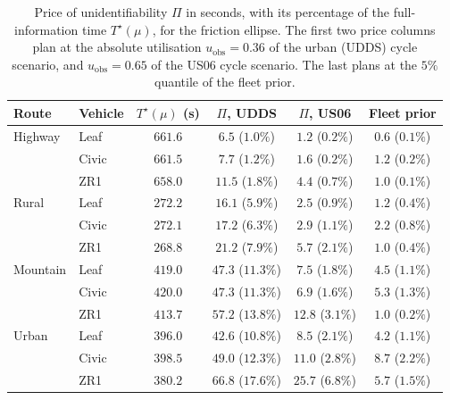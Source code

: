 \begin{table}[htbp]
\centering\small
\setlength{\tabcolsep}{4pt}
\caption{Price of unidentifiability $\Pi$ in seconds, with its percentage of the full-information time $T^\star(\mu)$, for the friction ellipse. The first two price columns plan at the absolute utilisation $u_{\mathrm{obs}}=0.36$ of the urban (UDDS) cycle scenario, and $u_{\mathrm{obs}}=0.65$ of the US06 cycle scenario. The last plans at the $5\%$ quantile of the fleet prior.}\label{tab:price}
\begin{tabular}{llcccc}
\toprule
Route & Vehicle & $T^\star(\mu)$ (s) & $\Pi$, UDDS & $\Pi$, US06 & Fleet prior\\
\midrule
Highway & Leaf & $661.6$ & $6.5$ ($1.0\%$) & $1.2$ ($0.2\%$) & $0.6$ ($0.1\%$)\\
& Civic & $661.5$ & $7.7$ ($1.2\%$) & $1.6$ ($0.2\%$) & $1.2$ ($0.2\%$)\\
& ZR1 & $658.0$ & $11.5$ ($1.8\%$) & $4.4$ ($0.7\%$) & $1.0$ ($0.1\%$)\\
Rural & Leaf & $272.2$ & $16.1$ ($5.9\%$) & $2.5$ ($0.9\%$) & $1.2$ ($0.4\%$)\\
& Civic & $272.1$ & $17.2$ ($6.3\%$) & $2.9$ ($1.1\%$) & $2.2$ ($0.8\%$)\\
& ZR1 & $268.8$ & $21.2$ ($7.9\%$) & $5.7$ ($2.1\%$) & $1.0$ ($0.4\%$)\\
Mountain & Leaf & $419.0$ & $47.3$ ($11.3\%$) & $7.5$ ($1.8\%$) & $4.5$ ($1.1\%$)\\
& Civic & $420.0$ & $47.3$ ($11.3\%$) & $6.9$ ($1.6\%$) & $5.3$ ($1.3\%$)\\
& ZR1 & $413.7$ & $57.2$ ($13.8\%$) & $12.8$ ($3.1\%$) & $1.0$ ($0.2\%$)\\
Urban & Leaf & $396.0$ & $42.6$ ($10.8\%$) & $8.5$ ($2.1\%$) & $4.2$ ($1.1\%$)\\
& Civic & $398.5$ & $49.0$ ($12.3\%$) & $11.0$ ($2.8\%$) & $8.7$ ($2.2\%$)\\
& ZR1 & $380.2$ & $66.8$ ($17.6\%$) & $25.7$ ($6.8\%$) & $5.7$ ($1.5\%$)\\
\bottomrule
\end{tabular}
\end{table}
